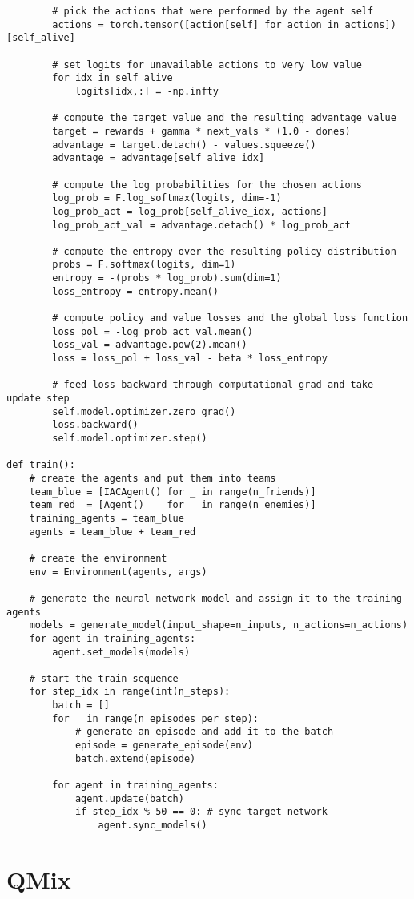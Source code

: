 \begin{appendices}
\begin{verbatim}
        # pick the actions that were performed by the agent self
        actions = torch.tensor([action[self] for action in actions])[self_alive]
        
        # set logits for unavailable actions to very low value
        for idx in self_alive
            logits[idx,:] = -np.infty
        
        # compute the target value and the resulting advantage value
        target = rewards + gamma * next_vals * (1.0 - dones)
        advantage = target.detach() - values.squeeze()
        advantage = advantage[self_alive_idx]        
        
        # compute the log probabilities for the chosen actions
        log_prob = F.log_softmax(logits, dim=-1)
        log_prob_act = log_prob[self_alive_idx, actions]
        log_prob_act_val = advantage.detach() * log_prob_act
        
        # compute the entropy over the resulting policy distribution
        probs = F.softmax(logits, dim=1)
        entropy = -(probs * log_prob).sum(dim=1)
        loss_entropy = entropy.mean()
        
        # compute policy and value losses and the global loss function
        loss_pol = -log_prob_act_val.mean()
        loss_val = advantage.pow(2).mean()
        loss = loss_pol + loss_val - beta * loss_entropy
        
        # feed loss backward through computational grad and take update step
        self.model.optimizer.zero_grad()
        loss.backward()
        self.model.optimizer.step()

def train():
    # create the agents and put them into teams
    team_blue = [IACAgent() for _ in range(n_friends)]
    team_red  = [Agent()    for _ in range(n_enemies)]
    training_agents = team_blue
    agents = team_blue + team_red
    
    # create the environment
    env = Environment(agents, args)

    # generate the neural network model and assign it to the training agents  
    models = generate_model(input_shape=n_inputs, n_actions=n_actions)
    for agent in training_agents:
        agent.set_models(models)

    # start the train sequence
    for step_idx in range(int(n_steps):
        batch = []
        for _ in range(n_episodes_per_step):
            # generate an episode and add it to the batch
            episode = generate_episode(env)
            batch.extend(episode)

        for agent in training_agents:
            agent.update(batch)
            if step_idx % 50 == 0: # sync target network
                agent.sync_models()
\end{verbatim}

\chapter{QMix}
\label{app:qmix}

\end{appendices}


